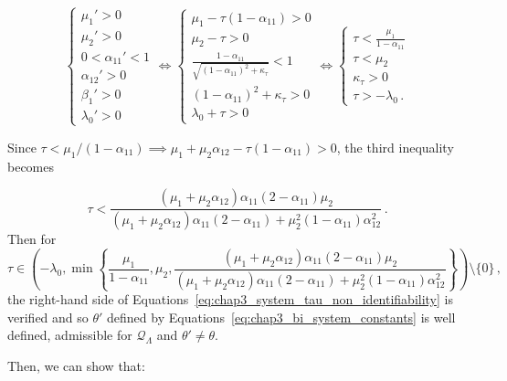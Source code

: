 \begin{subappendices}
\begin{itemize}
\begin{equation}\label{eq:chap3_system_tau_non_identifiability}
\begin{cases}
  \mu_1' > 0\\
  \mu_2' > 0\\
  0 < \alpha_{11}' < 1\\
  \alpha_{12}' > 0\\
  \beta_1' > 0\\
  \lambda_0' >0
\end{cases}\iff
\begin{cases}
  \mu_1 - \tau(1-\alpha_{11}) > 0\\
  \mu_2 - \tau > 0\\
  \frac{1-\alpha_{11}}{\sqrt{(1-\alpha_{11})^2 + \kappa_\tau}} < 1\\
  (1-\alpha_{11})^2 + \kappa_\tau > 0\\
  \lambda_0 + \tau > 0
\end{cases}\iff
\begin{cases}
  \tau < \frac{\mu_1}{1-\alpha_{11}}\\
  \tau < \mu_2\\
  \kappa_\tau > 0\\
  \tau > -\lambda_0\,.
\end{cases}
\end{equation}

Since $\tau < \mu_1/(1-\alpha_{11}) \implies \mu_1 + \mu_2 \alpha_{12} - \tau(1-\alpha_{11}) > 0$, the third inequality becomes

\[
\tau < \frac{(\mu_1 + \mu_2 \alpha_{12})\alpha_{11}(2-\alpha_{11})\mu_2}{(\mu_1 + \mu_2 \alpha_{12})\alpha_{11}(2-\alpha_{11}) + \mu_2^2(1-\alpha_{11}) \alpha_{12}^2}\,.
\]
Then for 
\[\tau \in \left(-\lambda_0, \min\left\{\frac{\mu_1}{1-\alpha_{11}}, \mu_2,  \frac{(\mu_1 + \mu_2 \alpha_{12})\alpha_{11}(2-\alpha_{11})\mu_2}{(\mu_1 + \mu_2 \alpha_{12})\alpha_{11}(2-\alpha_{11}) + \mu_2^2(1-\alpha_{11}) \alpha_{12}^2} \right\} \right)\setminus\{0\}\,,\]
the right-hand side of Equations~\eqref{eq:chap3_system_tau_non_identifiability} is verified and so $\theta'$ defined by Equations~\eqref{eq:chap3_bi_system_constants} is well defined, admissible for $\mathcal Q_\Lambda$ and $\theta' \neq \theta$.

Then, we can show that:


\end{itemize}
\end{subappendices}
